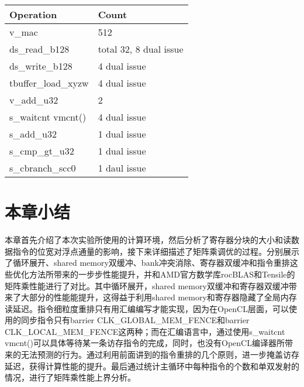 \begin{table}[htbp]
	\label{tab:fijiFFMA}
	\begin{center}
		\begin{tabular}{ | l | p{4cm} |}
			\hline
			Operation & Count \\ \hline
			v\_mac & 512  \\ \hline
			ds\_read\_b128 & total 32, 8 dual issue \\ \hline
			ds\_write\_b128 & 4 dual issue \\ \hline
			tbuffer\_load\_xyzw & 4 dual issue \\ \hline
			v\_add\_u32 & 2 \\ \hline
			s\_waitcnt vmcnt() & 4 dual issue \\ \hline
			s\_add\_u32 & 1 dual issue \\ \hline
			s\_cmp\_gt\_u32 & 1 dual issue \\ \hline
			s\_cbranch\_scc0 & 1 daul issue \\
			\hline
		\end{tabular}
	\end{center}	
\end{table}


\section{本章小结}
本章首先介绍了本次实验所使用的计算环境，然后分析了寄存器分块的大小和读数据指令的位宽对浮点通量的影响，接下来详细描述了矩阵乘调优的过程。分别展示了循环展开、shared memory双缓冲、bank冲突消除、寄存器双缓冲和指令重排这些优化方法所带来的一步步性能提升，并和AMD官方数学库rocBLAS和Tensile的矩阵乘性能进行了对比。其中循环展开，shared memory双缓冲和寄存器双缓冲带来了大部分的性能能提升，这得益于利用shared memory和寄存器隐藏了全局内存读延迟。指令细粒度重排只有用汇编编写才能实现，因为在OpenCL层面，可以使用的同步指令只有barrier CLK\_GLOBAL\_MEM\_FENCE和barrier CLK\_LOCAL\_MEM\_FENCE这两种；而在汇编语言中，通过使用s\_waitcnt vmcnt()可以具体等待某一条访存指令的完成，同时，也没有OpenCL编译器所带来的无法预测的行为。通过利用前面讲到的指令重排的几个原则，进一步掩盖访存延迟，获得计算性能的提升。最后通过统计主循环中每种指令的个数和单双发射的情况，进行了矩阵乘性能上界分析。

